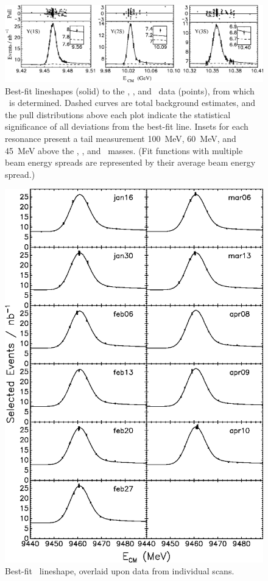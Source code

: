 \documentclass{cornell}
\begin{document}
\begin{figure}
  \begin{center}
    \includegraphics[width=\linewidth]{freefits}
  \end{center}
  \caption[Best-fit lineshapes for \us, \uss, and
  \usss]{\label{fitresults} Best-fit lineshapes (solid) to the \us,
  \uss, and \usss\ data (points), from which \geehadtot\ is
  determined.  Dashed curves are total background estimates, and the
  pull distributions above each plot indicate the statistical
  significance of all deviations from the best-fit line.  Insets for
  each resonance present a tail measurement 100~MeV, 60~MeV, and
  45~MeV above the \us, \uss, and \usss\ masses.  (Fit functions with
  multiple beam energy spreads are represented by their average beam
  energy spread.)}
\end{figure}

\begin{figure}[p]
  \begin{center}
    \includegraphics[width=0.9\linewidth]{allscanss}
  \end{center}
  \caption[Best-fit lineshape for each \us\ scan]{\label{allscanss} Best-fit \us\ lineshape,
  overlaid upon data from individual scans.}
\end{figure}
\end{document}
